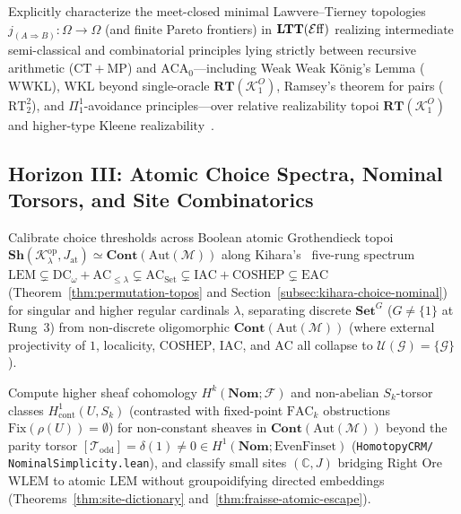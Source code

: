 \begin{problem}\label{prob:open-4}
Explicitly characterize the meet-closed minimal Lawvere--Tierney topologies $j_{(A \Rightarrow B)} : \Omega \to \Omega$ (and finite Pareto frontiers) in $\mathbf{LTT}(\mathcal{E}\mathrm{ff})$ realizing intermediate semi-classical and combinatorial principles lying strictly between recursive arithmetic ($\mathrm{CT} + \mathrm{MP}$) and $\mathrm{ACA}_0$---including Weak Weak K\"onig's Lemma ($\mathrm{WWKL}$), $\mathrm{WKL}$ beyond single-oracle $\mathbf{RT}(\mathcal{K}_1^O)$, Ramsey's theorem for pairs ($\mathrm{RT}^2_2$), and $\Pi^1_1$-avoidance principles---over relative realizability topoi $\mathbf{RT}(\mathcal{K}_1^O)$ and higher-type Kleene realizability~\cite{vanOosten90}.
\end{problem}

\subsection*{Horizon III: Atomic Choice Spectra, Nominal Torsors, and Site Combinatorics}

\begin{problem}\label{prob:open-5}
Calibrate choice thresholds across Boolean atomic Grothendieck topoi $\mathbf{Sh}(\mathcal{K}_\lambda^{\mathrm{op}}, J_{\mathrm{at}}) \simeq \mathbf{Cont}(\mathrm{Aut}(\mathcal{M}))$ along Kihara's~\cite{Kihara26} five-rung spectrum $\mathrm{LEM} \subsetneq \mathrm{DC}_\omega + \mathrm{AC}_{\le \lambda} \subsetneq \mathrm{AC}_{\mathrm{Set}} \subsetneq \mathrm{IAC} + \mathrm{COSHEP} \subsetneq \mathrm{EAC}$ (Theorem~\ref{thm:permutation-topos} and Section~\ref{subsec:kihara-choice-nominal}) for singular and higher regular cardinals $\lambda$, separating discrete $\mathbf{Set}^G$ ($G \neq \{1\}$ at Rung~3) from non-discrete oligomorphic $\mathbf{Cont}(\mathrm{Aut}(\mathcal{M}))$ (where external projectivity of $1$, localicity, $\mathrm{COSHEP}$, $\mathrm{IAC}$, and $\mathrm{AC}$ all collapse to $\mathcal{U}(\mathcal{G}) = \{\mathcal{G}\}$).
\end{problem}

\begin{problem}\label{prob:open-6}
Compute higher sheaf cohomology $H^k(\mathbf{Nom}; \mathcal{F})$ and non-abelian $S_k$-torsor classes $H^1_{\mathrm{cont}}(U, S_k)$ (contrasted with fixed-point $\mathrm{FAC}_k$ obstructions $\mathrm{Fix}(\rho(U)) = \emptyset$) for non-constant sheaves in $\mathbf{Cont}(\mathrm{Aut}(\mathcal{M}))$ beyond the parity torsor $[\mathcal{T}_{\mathrm{odd}}] = \delta(1) \neq 0 \in H^1(\mathbf{Nom}; \mathrm{EvenFinset})$ (\texttt{HomotopyCRM/ NominalSimplicity.lean}), and classify small sites $(\mathbb{C}, J)$ bridging Right Ore $\mathrm{WLEM}$ to atomic $\mathrm{LEM}$ without groupoidifying directed embeddings (Theorems~\ref{thm:site-dictionary} and~\ref{thm:fraisse-atomic-escape}).
\end{problem}


